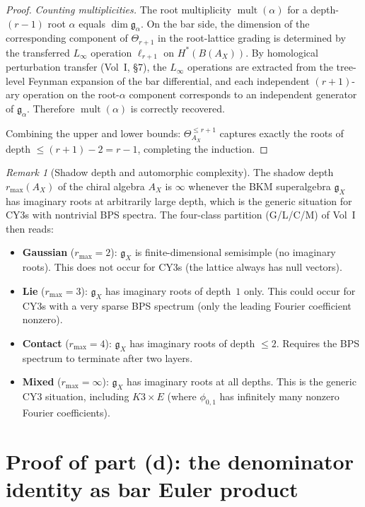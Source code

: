 \documentclass[11pt]{amsart}
\theoremstyle{definition}
\theoremstyle{remark}
\newtheorem{remark}[theorem]{Remark}
\DeclareMathOperator{\mult}{mult}
\newcommand{\fg}{\mathfrak{g}}
\begin{document}
\begin{proof}
\emph{Counting multiplicities.} The root multiplicity
$\mult(\alpha)$ for a depth-$(r-1)$ root $\alpha$ equals
$\dim \fg_\alpha$. On the bar side, the dimension of the
corresponding component of $\Theta_{r+1}$ in the root-lattice
grading is determined by the transferred $L_\infty$ operation
$\ell_{r+1}$ on $H^*(B(A_X))$. By homological perturbation
transfer (Vol~I, \S7), the $L_\infty$ operations are extracted
from the tree-level Feynman expansion of the bar differential,
and each independent $(r+1)$-ary operation on the root-$\alpha$
component corresponds to an independent generator of
$\fg_\alpha$. Therefore $\mult(\alpha)$ is correctly recovered.

Combining the upper and lower bounds: $\Theta^{\leq r+1}_{A_X}$
captures exactly the roots of depth $\leq (r+1) - 2 = r - 1$,
completing the induction.
\end{proof}

\begin{remark}[Shadow depth and automorphic complexity]
\label{rem:shadow-depth}
The shadow depth $r_{\max}(A_X)$ of the chiral algebra $A_X$
is $\infty$ whenever the BKM superalgebra $\fg_X$ has
imaginary roots at arbitrarily large depth, which is the
generic situation for CY3s with nontrivial BPS spectra. The
four-class partition (G/L/C/M) of Vol~I then reads:
\begin{itemize}
 \item \textbf{Gaussian} ($r_{\max} = 2$): $\fg_X$ is
 finite-dimensional semisimple (no imaginary roots). This
 does not occur for CY3s (the lattice always has null vectors).
 \item \textbf{Lie} ($r_{\max} = 3$): $\fg_X$ has imaginary
 roots of depth~$1$ only. This could occur for CY3s with a
 very sparse BPS spectrum (only the leading Fourier coefficient
 nonzero).
 \item \textbf{Contact} ($r_{\max} = 4$): $\fg_X$ has imaginary
 roots of depth $\leq 2$. Requires the BPS spectrum to
 terminate after two layers.
 \item \textbf{Mixed} ($r_{\max} = \infty$): $\fg_X$ has
 imaginary roots at all depths. This is the generic CY3
 situation, including $K3 \times E$ (where $\phi_{0,1}$
 has infinitely many nonzero Fourier coefficients).
\end{itemize}
\end{remark}

\section{Proof of part (d): the denominator identity as bar
Euler product}\label{sec:proof-d}
\end{document}
